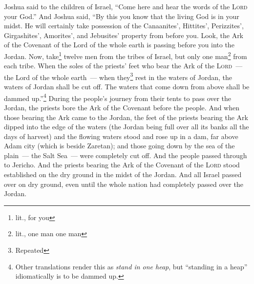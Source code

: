 \begin{inparaenum}
     Joshua said to the children of Israel, ``Come here and hear the words of the \textsc{Lord} your God.''%
     And Joshua said, ``By this you know that the living God is in your midst. He will certainly take possession of the Canaanites', Hittites', Perizzites', Girgashites', Amorites', and Jebusites' property from before you.%
     Look, the Ark of the Covenant of the Lord of the whole earth is passing before you into the Jordan.%
     Now, take\footnote{lit., for you} twelve men from the tribes of Israel, but only one man\footnote{lit., one man one man} from each tribe.%
     When the soles of the priests' feet who bear the Ark of the \textsc{Lord}~--- the Lord of the whole earth~--- when they\footnote{Repeated} rest in the waters of Jordan, the waters of Jordan shall be cut off. The waters that come down from above shall be dammed up.''\footnote{Other translations render this as \textit{stand in one heap}, but ``standing in a heap'' idiomatically is to be dammed up.}%
     During the people's journey from their tents to pass over the Jordan, the priests bore the Ark of the Covenant before the people.%
     And when those bearing the Ark came to the Jordan, the feet of the priests bearing the Ark dipped into the edge of the waters (the Jordan being full over all its banks all the days of harvest)%
     and the flowing waters stood and rose up in a dam, far above Adam city (which is beside Zaretan); and those going down by the sea of the plain~--- the Salt Sea~--- were completely cut off. And the people passed through to Jericho.%
     And the priests bearing the Ark of the Covenant of the \textsc{Lord} stood established on the dry ground in the midst of the Jordan. And all Israel passed over on dry ground, even until the whole nation had completely passed over the Jordan.%
\end{inparaenum}

